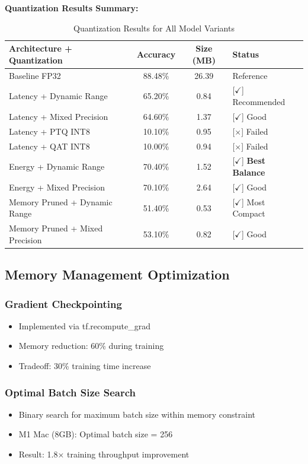 \documentclass[10pt, a4paper]{article}
\begin{document}
\textbf{Quantization Results Summary:}

\begin{table}[H]
\centering
\scriptsize
\begin{tabular}{|l|c|c|l|}
\hline
\textbf{Architecture + Quantization} & \textbf{Accuracy} & \textbf{Size (MB)} & \textbf{Status} \\
\hline
Baseline FP32 & 88.48\% & 26.39 & Reference \\
Latency + Dynamic Range & 65.20\% & 0.84 & [$\checkmark$] Recommended \\
Latency + Mixed Precision & 64.60\% & 1.37 & [$\checkmark$] Good \\
Latency + PTQ INT8 & 10.10\% & 0.95 & [$\times$] Failed \\
Latency + QAT INT8 & 10.00\% & 0.94 & [$\times$] Failed \\
Energy + Dynamic Range & 70.40\% & 1.52 & [$\checkmark$] \textbf{Best Balance} \\
Energy + Mixed Precision & 70.10\% & 2.64 & [$\checkmark$] Good \\
Memory Pruned + Dynamic Range & 51.40\% & 0.53 & [$\checkmark$] Most Compact \\
Memory Pruned + Mixed Precision & 53.10\% & 0.82 & [$\checkmark$] Good \\
\hline
\end{tabular}
\caption{Quantization Results for All Model Variants}
\end{table}

\subsection{Memory Management Optimization}

\subsubsection{Gradient Checkpointing}
\begin{itemize}
    \item Implemented via tf.recompute\_grad
    \item Memory reduction: 60\% during training
    \item Tradeoff: 30\% training time increase
\end{itemize}

\subsubsection{Optimal Batch Size Search}
\begin{itemize}
    \item Binary search for maximum batch size within memory constraint
    \item M1 Mac (8GB): Optimal batch size = 256
    \item Result: 1.8× training throughput improvement
\end{itemize}
\end{document}
